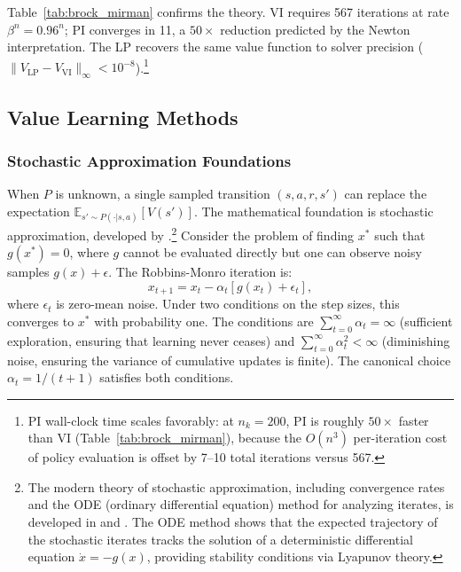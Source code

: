 Table~\ref{tab:brock_mirman} confirms the theory. VI requires 567 iterations at rate $\beta^n = 0.96^n$; PI converges in 11, a $50\times$ reduction predicted by the Newton interpretation. The \citet{manne1960} LP recovers the same value function to solver precision ($\|V_{\text{LP}} - V_{\text{VI}}\|_\infty < 10^{-8}$).\footnote{PI wall-clock time scales favorably: at $n_k = 200$, PI is roughly $50\times$ faster than VI (Table~\ref{tab:brock_mirman}), because the $O(n^3)$ per-iteration cost of policy evaluation is offset by 7--10 total iterations versus 567.}




\subsection{Value Learning Methods}
\label{sec:stochastic_approx}

\subsubsection{Stochastic Approximation Foundations}

When $P$ is unknown, a single sampled transition $(s, a, r, s')$ can replace the expectation $\mathbb{E}_{s' \sim P(\cdot|s,a)}[V(s')]$. The mathematical foundation is stochastic approximation, developed by \citet{Robbins1952}.\footnote{The modern theory of stochastic approximation, including convergence rates and the ODE (ordinary differential equation) method for analyzing iterates, is developed in \citet{kushner1978} and \citet{borkar2000}. The ODE method shows that the expected trajectory of the stochastic iterates tracks the solution of a deterministic differential equation $\dot{x} = -g(x)$, providing stability conditions via Lyapunov theory.} Consider the problem of finding $x^*$ such that $g(x^*) = 0$, where $g$ cannot be evaluated directly but one can observe noisy samples $g(x) + \epsilon$. The Robbins-Monro iteration is:
\begin{equation}
x_{t+1} = x_t - \alpha_t [g(x_t) + \epsilon_t],
\label{eq:robbins_monro}
\end{equation}
where $\epsilon_t$ is zero-mean noise. Under two conditions on the step sizes, this converges to $x^*$ with probability one. The conditions are $\sum_{t=0}^\infty \alpha_t = \infty$ (sufficient exploration, ensuring that learning never ceases) and $\sum_{t=0}^\infty \alpha_t^2 < \infty$ (diminishing noise, ensuring the variance of cumulative updates is finite). The canonical choice $\alpha_t = 1/(t+1)$ satisfies both conditions.

